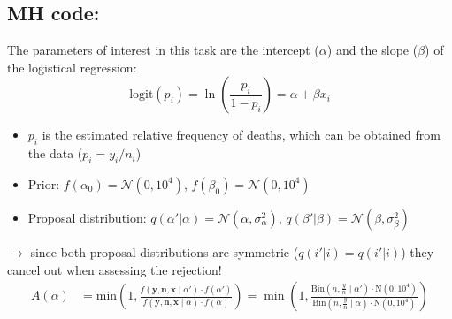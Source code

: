\documentclass{article}\usepackage[]{graphicx}\usepackage[]{xcolor}
\begin{document}
\begin{multicols*}{2}
\subsection{MH code:}
The parameters of interest in this task are the intercept ($\alpha$) and the slope ($\beta$) of the logistical regression:
$$
\text{logit}(p_i)=\ln\left(\frac{p_i}{1-p_i} \right)=\alpha+\beta x_i
$$
\begin{itemize}
\item $p_i$ is the estimated relative frequency of deaths, which can be obtained from the data ($p_i=y_i/n_i$)
\item Prior: $f(\alpha_0)=\mathcal{N}(0,10^{4})$, $f(\beta_0)=\mathcal{N}(0,10^{4})$
\item Proposal distribution: $q(\alpha'|\alpha)=\mathcal{N}(\alpha,\sigma^2_{\alpha})$, $q(\beta'|\beta)=\mathcal{N}(\beta,\sigma^2_{\beta})$
\end{itemize}
$\rightarrow$ since both proposal distributions are symmetric ($q(i'|i)=q(i'|i)$) they cancel out when assessing the rejection!
\begin{align*}
A(\alpha)&=\text{min}\left(1,\frac{f(\mathbf{y},\mathbf{n},\mathbf{x}\mid\alpha')\cdot f(\alpha') }
{f(\mathbf{y},\mathbf{n},\mathbf{x}\mid \alpha)\cdot f(\alpha)} \right)=\min\left(1,\frac{\text{Bin}(n, \frac{y}{n}\mid\alpha')\cdot \text{N}(0,10^4 )}
{\text{Bin}(n, \frac{y}{n}\mid\alpha)\cdot \text{N}(0,10^4 )} \right)
\end{align*}


\end{multicols*}
\end{document}

